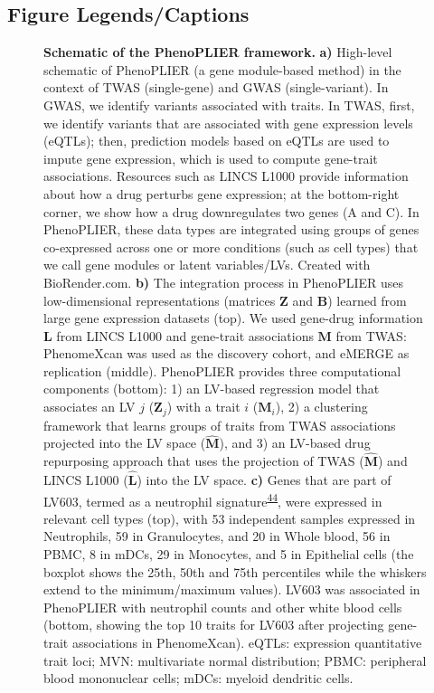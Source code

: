 \documentclass[
  a4paper,
]{article}
\begin{document}
\clearpage

\hypertarget{figurecaptions}{%
\subsection{Figure Legends/Captions}\label{figurecaptions}}

\begin{figure}
\hypertarget{fig:entire_process}{%
\centering
\caption{\textbf{Schematic of the PhenoPLIER framework.}
\textbf{a)} High-level schematic of PhenoPLIER (a gene module-based method) in the context of TWAS (single-gene) and GWAS (single-variant).
In GWAS, we identify variants associated with traits.
In TWAS, first, we identify variants that are associated with gene expression levels (eQTLs); then, prediction models based on eQTLs are used to impute gene expression, which is used to compute gene-trait associations.
Resources such as LINCS L1000 provide information about how a drug perturbs gene expression; at the bottom-right corner, we show how a drug downregulates two genes (A and C).
In PhenoPLIER, these data types are integrated using groups of genes co-expressed across one or more conditions (such as cell types) that we call gene modules or latent variables/LVs. Created with BioRender.com.
\textbf{b)} The integration process in PhenoPLIER uses low-dimensional representations (matrices \(\mathbf{Z}\) and \(\mathbf{B}\)) learned from large gene expression datasets (top).
We used gene-drug information \(\mathbf{L}\) from LINCS L1000 and gene-trait associations \(\mathbf{M}\) from TWAS: PhenomeXcan was used as the discovery cohort, and eMERGE as replication (middle).
PhenoPLIER provides three computational components (bottom):
1) an LV-based regression model that associates an LV \(j\) (\(\mathbf{Z}_j\)) with a trait \(i\) (\(\mathbf{M}_i\)),
2) a clustering framework that learns groups of traits from TWAS associations projected into the LV space (\(\hat{\mathbf{M}}\)),
and 3) an LV-based drug repurposing approach that uses the projection of TWAS (\(\hat{\mathbf{M}}\)) and LINCS L1000 (\(\hat{\mathbf{L}}\)) into the LV space.
\textbf{c)} Genes that are part of LV603, termed as a neutrophil signature\textsuperscript{\protect\hyperlink{ref-14rnBunuZ}{44}}, were expressed in relevant cell types (top), with 53 independent samples expressed in Neutrophils, 59 in Granulocytes, and 20 in Whole blood, 56 in PBMC, 8 in mDCs, 29 in Monocytes, and 5 in Epithelial cells (the boxplot shows the 25th, 50th and 75th percentiles while the whiskers extend to the minimum/maximum values).
LV603 was associated in PhenoPLIER with neutrophil counts and other white blood cells (bottom, showing the top 10 traits for LV603 after projecting gene-trait associations in PhenomeXcan).
eQTLs: expression quantitative trait loci;
MVN: multivariate normal distribution;
PBMC: peripheral blood mononuclear cells;
mDCs: myeloid dendritic cells.}\label{fig:entire_process}
}
\end{figure}
\end{document}
